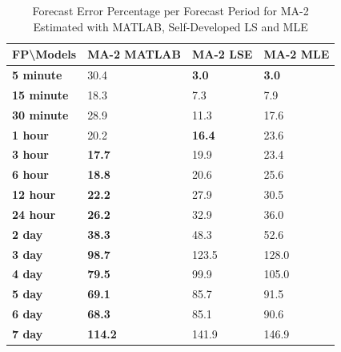 \documentclass[journal]{IEEEtran}
\begin{document}
\begin{table}[htpb]
  \centering
  \caption{Forecast Error Percentage per Forecast Period for MA-2 Estimated with MATLAB, Self-Developed LS and MLE}
\begin{tabular}{|l|l|l|l|}
\hline
\textbf{FP\textbackslash{}Models} & \textbf{MA-2 MATLAB} & \textbf{MA-2 LSE} & \textbf{MA-2 MLE} \\ \hline
\textbf{5 minute}                 & 30.4                 & \textbf{3.0}      & \textbf{3.0}      \\ \hline
\textbf{15 minute}                & 18.3                 & 7.3               & 7.9               \\ \hline
\textbf{30 minute}                & 28.9                 & 11.3              & 17.6              \\ \hline
\textbf{1 hour}                   & 20.2                 & \textbf{16.4}     & 23.6              \\ \hline
\textbf{3 hour}                   & \textbf{17.7}        & 19.9              & 23.4              \\ \hline
\textbf{6 hour}                   & \textbf{18.8}        & 20.6              & 25.6              \\ \hline
\textbf{12 hour}                  & \textbf{22.2}        & 27.9              & 30.5              \\ \hline
\textbf{24 hour}                  & \textbf{26.2}        & 32.9              & 36.0              \\ \hline
\textbf{2 day}                    & \textbf{38.3}        & 48.3              & 52.6              \\ \hline
\textbf{3 day}                    & \textbf{98.7}        & 123.5             & 128.0             \\ \hline
\textbf{4 day}                    & \textbf{79.5}        & 99.9              & 105.0             \\ \hline
\textbf{5 day}                    & \textbf{69.1}        & 85.7              & 91.5              \\ \hline
\textbf{6 day}                    & \textbf{68.3}        & 85.1              & 90.6              \\ \hline
\textbf{7 day}                    & \textbf{114.2}       & 141.9             & 146.9             \\ \hline
\end{tabular}
\label{tab8}
\end{table}
\end{document}
